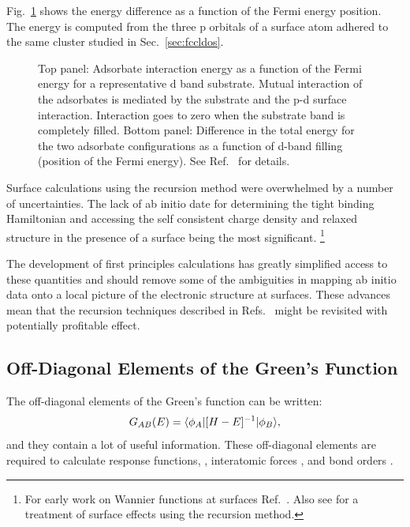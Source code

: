%

Fig.~\ref{fig:burkesurface} shows the energy difference as a function of the 
Fermi energy position. The energy is computed from the three p orbitals of a 
surface atom adhered to the same cluster studied in Sec.~\ref{sec:fccldos}.
%
\begin{figure}
\begin{center}
{\graphicspath{{./invariance/rec_examples/exorpeel/}}}
\caption{Top panel: Adsorbate interaction energy as a function of the Fermi energy for a representative d band
substrate. Mutual interaction of the adsorbates is mediated by the substrate and the p-d surface interaction.
Interaction goes to zero when the substrate band is completely filled. 
Bottom panel: Difference in the total energy for the two adsorbate configurations as a function of
d-band filling (position of the Fermi energy). See Ref.~\cite{burke76} for details. \label{fig:burkesurface}}
\end{center}
\end{figure}
%

Surface calculations using the recursion method were
overwhelmed by a number of uncertainties.
The lack of ab initio date for determining the tight binding 
Hamiltonian and accessing the self consistent charge density
and relaxed structure in the presence of a surface being the most significant.
\footnote{For early work on Wannier functions at surfaces Ref.~\cite{smith74}. Also see 
\cite{mostoller79} for a treatment of surface effects using the recursion method.}

The development of first principles calculations 
has greatly simplified access to these quantities and should remove 
some of the ambiguities in mapping ab initio data onto a local picture
of the electronic structure at surfaces. These advances mean that the 
recursion techniques described in Refs.~\cite{burke76, haydock79, haydock81} 
might be revisited with potentially profitable effect. 

\subsection{Off-Diagonal Elements of the Green's Function}
The off-diagonal elements of the Green's function can be written:
%
\begin{equation}
G_{AB}(E) = \langle \phi_{A}|[H-E]^{-1}|\phi_{B}\rangle,
\end{equation}
%
and they contain a lot of useful information. 
These off-diagonal elements are required to calculate 
response functions, \cite{terakura78}, interatomic 
forces \cite{finnis84, finnis87, ohta87}, and bond orders 
\cite{coulson39,tersoff86,pettifor89}.

